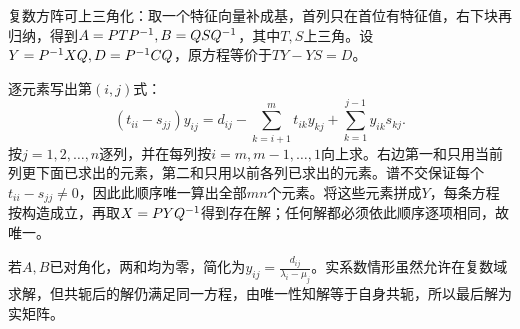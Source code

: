 \label{der:sylvester-full}
复数方阵可上三角化：取一个特征向量补成基，首列只在首位有特征值，右下块再归纳，得到$A=PTP^{-1},B=QSQ^{-1}$，其中$T,S$上三角。设$Y=P^{-1} XQ,D=P^{-1} CQ$，原方程等价于$TY-YS=D$。

逐元素写出第$(i,j)$式：
\[(t_{ii}-s_{jj})y_{ij}=d_{ij}-\sum_{k=i+1}^m t_{ik}y_{kj}+\sum_{k=1}^{j-1}y_{ik}s_{kj}.\]
按$j=1,2,\ldots,n$逐列，并在每列按$i=m,m-1,\ldots,1$向上求。右边第一和只用当前列更下面已求出的元素，第二和只用以前各列已求出的元素。谱不交保证每个$t_{ii}-s_{jj}\ne0$，因此此顺序唯一算出全部$mn$个元素。将这些元素拼成$Y$，每条方程按构造成立，再取$X=PYQ^{-1}$得到存在解；任何解都必须依此顺序逐项相同，故唯一。

若$A,B$已对角化，两和均为零，简化为$y_{ij}=\frac{d_{ij}}{\lambda_i-\mu_j}$。实系数情形虽然允许在复数域求解，但共轭后的解仍满足同一方程，由唯一性知解等于自身共轭，所以最后解为实矩阵。
